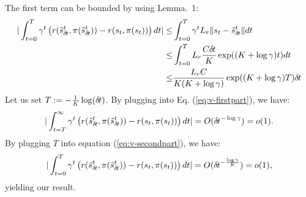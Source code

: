 The first term can be bounded by using Lemma.~1:
\begin{align}
  | \int_{t=0}^T\gamma^t \left(r(\tilde s_{\delta\hspace{-.1em}t}^t, \pi(\tilde s_{\delta\hspace{-.1em}t}^t)) - r(s_t, \pi(s_t)) \right)dt | \leq& \int_{t=0}^T\gamma^t L_r \| s_t - \tilde s_{\delta\hspace{-.1em}t}^t \| dt \\
  \leq& \int_{t=0}^T L_r \frac{C {\delta\hspace{-.1em}t}}{K} \exp((K + \log \gamma)t ) dt \\
  \leq&  \frac{L_r C}{K(K + \log \gamma)}\exp((K + \log \gamma)T ) {\delta\hspace{-.1em}t}
   \label{eq:v-secondpart}
\end{align}
Let us set $T \mathrel{\mathop{:}}= -\frac{1}{K}\log({\delta\hspace{-.1em}t})$. By plugging into Eq. (\ref{eq:v-firstpart}), we have:
\begin{align}
	| \int_{t=T}^\infty\gamma^t \left(r(\tilde s_{\delta\hspace{-.1em}t}^t, \pi(\tilde s_{\delta\hspace{-.1em}t}^t)) - r(s_t, \pi(s_t)) \right)dt | = O( {\delta\hspace{-.1em}t}^{-\log\gamma}) = o(1).
\end{align}
By plugging $T$ into equation (\ref{eq:v-secondpart}), we have:
\begin{align}
	| \int_{t=0}^T\gamma^t \left(r(\tilde s_{\delta\hspace{-.1em}t}^t, \pi(\tilde s_{\delta\hspace{-.1em}t}^t)) - r(s_t, \pi(s_t)) \right)dt | = O( {\delta\hspace{-.1em}t}^{-\frac{\log\gamma}{K}}) = o(1),
\end{align}
yielding our result.

